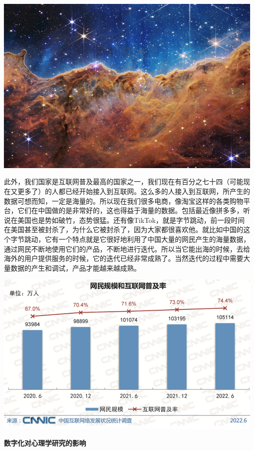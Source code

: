 \documentclass[
  oneside]{book}
\begin{document}
\includegraphics{1001-lesson1/image-20230302194916461.png}

此外，我们国家是互联网普及最高的国家之一，我们现在有百分之七十四（可能现在又更多了）的人都已经开始接入到互联网。这么多的人接入到互联网，所产生的数据可想而知，一定是海量的。所以现在我们很多电商，像淘宝这样的各类购物平台，它们在中国做的是非常好的，这也得益于海量的数据。包括最近像拼多多，听说在美国也是势如破竹，态势很猛。还有像TikTok，就是字节跳动，前一段时间在美国甚至被封杀了，为什么它被封杀了，因为大家都很喜欢他。就比如中国的这个字节跳动，它有一个特点就是它很好地利用了中国大量的网民产生的海量数据，通过网民不断地使用它们的产品，不断地进行迭代。所以当它能出海的时候，去给海外的用户提供服务的时候，它的迭代已经非常成熟了。当然迭代的过程中需要大量数据的产生和调试，产品才能越来越成熟。

\includegraphics{1001-lesson1/image-20230302194931963.png}

\textbf{数字化对心理学研究的影响}
\end{document}
